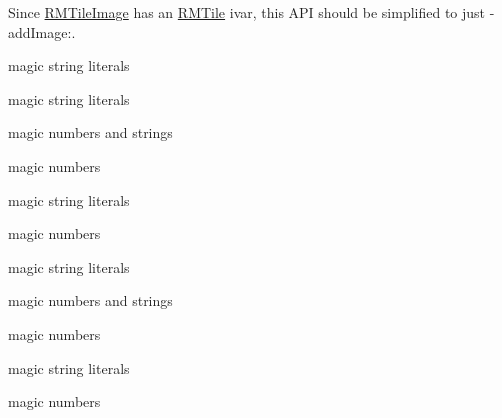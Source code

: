 \begin{DoxyRefList}
Since \hyperlink{interface_r_m_tile_image}{R\-M\-Tile\-Image} has an \hyperlink{struct_r_m_tile}{R\-M\-Tile} ivar, this A\-P\-I should be simplified to just -\/add\-Image\-:.  
\item[\label{bug__bug000043}%
\hypertarget{bug__bug000043}{}%
成员 \hyperlink{interface_r_m_tile_cache_ad98dd8c66c48285943c6cf61bf9b9cb9}{\mbox{[}R\-M\-Tile\-Cache init\-With\-Tile\-Source\-:\mbox{]}} ]magic string literals 

magic string literals  
\item[\label{bug__bug000046}%
\hypertarget{bug__bug000046}{}%
成员 \hyperlink{category_r_m_tile_cache_07_configuration_08_a0fed814002237dc293bc9fc134dfc142}{\mbox{[}R\-M\-Tile\-Cache(Configuration) new\-Database\-Cache\-With\-Config\-:tile\-Source\-:\mbox{]}} ]magic numbers and strings 

magic numbers 

magic string literals 

magic numbers 

magic string literals  
\item[\label{bug__bug000046}%
\hypertarget{bug__bug000046}{}%
成员 \hyperlink{category_r_m_tile_cache_07_configuration_08_a0fed814002237dc293bc9fc134dfc142}{\mbox{[}R\-M\-Tile\-Cache(Configuration) new\-Database\-Cache\-With\-Config\-:tile\-Source\-:\mbox{]}} ]magic numbers and strings 

magic numbers 

magic string literals 

magic numbers 


\end{DoxyRefList}
